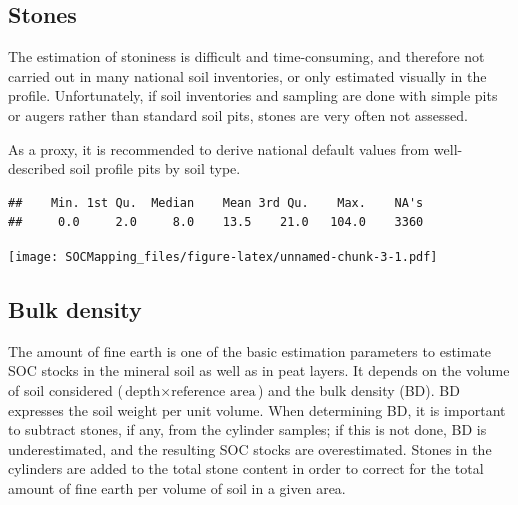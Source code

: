 \documentclass[10pt,b5paper,]{book}
\newenvironment{Shaded}{\begin{snugshade}}{\end{snugshade}}
\newcommand{\CommentTok}[1]{\textcolor[rgb]{0.56,0.35,0.01}{\textit{#1}}}
\newcommand{\DataTypeTok}[1]{\textcolor[rgb]{0.13,0.29,0.53}{#1}}
\newcommand{\DecValTok}[1]{\textcolor[rgb]{0.00,0.00,0.81}{#1}}
\newcommand{\KeywordTok}[1]{\textcolor[rgb]{0.13,0.29,0.53}{\textbf{#1}}}
\newcommand{\NormalTok}[1]{#1}
\newcommand{\OperatorTok}[1]{\textcolor[rgb]{0.81,0.36,0.00}{\textbf{#1}}}
\newcommand{\StringTok}[1]{\textcolor[rgb]{0.31,0.60,0.02}{#1}}
\theoremstyle{definition}
\theoremstyle{definition}
\theoremstyle{definition}
\theoremstyle{remark}
\begin{document}
\hypertarget{stones}{%
\subsection{Stones}\label{stones}}

The estimation of stoniness is difficult and time-consuming, and
therefore not carried out in many national soil inventories, or only
estimated visually in the profile. Unfortunately, if soil inventories
and sampling are done with simple pits or augers rather than standard
soil pits, stones are very often not assessed.

As a proxy, it is recommended to derive national default values from
well-described soil profile pits by soil type.

\begin{Shaded}
\end{Shaded}

\begin{verbatim}
##    Min. 1st Qu.  Median    Mean 3rd Qu.    Max.    NA's 
##     0.0     2.0     8.0    13.5    21.0   104.0    3360
\end{verbatim}

\begin{Shaded}
\end{Shaded}

\texttt{[image: SOCMapping\_files/figure-latex/unnamed-chunk-3-1.pdf]}

\hypertarget{bulk-density}{%
\subsection{Bulk density}\label{bulk-density}}

The amount of fine earth is one of the basic estimation parameters to
estimate SOC stocks in the mineral soil as well as in peat layers. It
depends on the volume of soil considered
(\(\text{depth} \times \text{reference area}\)) and the bulk density
(BD). BD expresses the soil weight per unit volume. When determining BD,
it is important to subtract stones, if any, from the cylinder samples;
if this is not done, BD is underestimated, and the resulting SOC stocks
are overestimated. Stones in the cylinders are added to the total stone
content in order to correct for the total amount of fine earth per
volume of soil in a given area.
\end{document}
